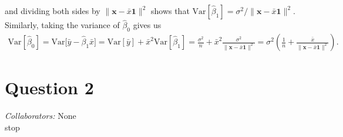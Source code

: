 \documentclass[10pt]{article}
\newcommand{\mycolab}[1]{\textcolor{colabcol}{\textsl{Collaborators:}} #1\\}
\begin{document}
\begin{itemize}
    and dividing both sides by \(\|\mathbf{x} - \bar{x}\mathbf{1}\|^2\) shows that 
    \(\mathrm{Var}[\hat{\beta}_1] = \sigma^2 / \|\mathbf{x} - \bar{x}\mathbf{1}\|^2\). 
    Similarly, taking the variance of \(\hat{\beta}_0\) gives us 
    \begin{align*}
        \mathrm{Var}[\hat{\beta}_0] = \mathrm{Var} \big[ \bar{y} - \hat{\beta}_1 \bar{x} \big]
        = \mathrm{Var}[\bar{y}] + \bar{x}^2 \mathrm{Var}[\hat{\beta}_1]
        = \frac{\sigma^2}{n} + \bar{x}^2\frac{\sigma^2}{\|\mathbf{x} - \bar{x}\mathbf{1}\|^2}
        = \sigma^2 \left( \frac{1}{n} + \frac{\bar{x}}{\|\mathbf{x} - \bar{x}\mathbf{1}\|^2} \right).
    \end{align*}
\end{itemize}

\section{Question 2} \noindent
\mycolab{None}
stop
\end{document}
